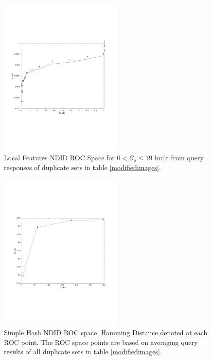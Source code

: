 \documentclass[english,12pt,a4paper,pdftex,elec,utf8, table]{aaltothesis}
\begin{document}
\begin{figure}[htb]
\begin{center}
\includegraphics[height=8cm]{figures/SIFTROCperCutoff}
\end{center}
\caption{ Local Features NDID ROC Space for $0 < \mathcal{C}_{s} \leq 19$ built from query responses of duplicate sets in table \ref{modifiedimages}.}
\label{figcutoffrocspace}
\end{figure}

\begin{figure}[htb]
\begin{center}
\includegraphics[height=8cm]{figures/simpleTotalROC}
\end{center}
\caption{Simple Hash NDID ROC space. Hamming Distance denoted at each ROC point. The ROC space points are based on averaging query results of all duplicate sets in table \ref{modifiedimages}. }
\label{simpletotalroc}
\end{figure}
\end{document}
